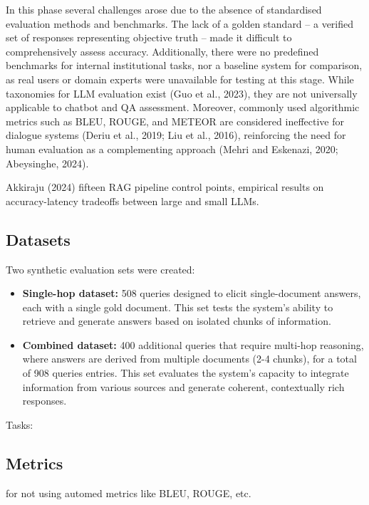 \begin{spacing}{1.5}
In this phase several challenges arose due to the absence of standardised
evaluation methods and benchmarks. The lack of a golden standard – a verified set of responses representing objective truth – made it difficult to comprehensively assess accuracy. Additionally, there were no predefined benchmarks for internal institutional tasks, nor a baseline system for comparison, as real users or domain experts were unavailable for testing at this stage. While taxonomies for LLM evaluation exist (Guo et al., 2023), they are not universally applicable to chatbot and QA assessment. Moreover,
commonly used algorithmic metrics such as BLEU, ROUGE, and METEOR are
considered ineffective for dialogue systems (Deriu et al., 2019; Liu et al., 2016), reinforcing the need for human evaluation as a complementing approach (Mehri and
Eskenazi, 2020; Abeysinghe, 2024).

Akkiraju (2024) fifteen RAG pipeline control points, empirical results on accuracy-latency tradeoffs between large and small LLMs.

\subsection{Datasets}\label{sec:datasets}

Two synthetic evaluation sets were created:
\begin{itemize}
      \item \textbf{Single-hop dataset:} 508 queries designed to elicit single-document answers, each with a single gold document. This set tests the system's ability to retrieve and generate answers based on isolated chunks of information.
      \item \textbf{Combined dataset:} 400 additional queries that require multi-hop reasoning, where answers are derived from multiple documents (2-4 chunks), for a total of 908 queries entries. This set evaluates the system's capacity to integrate information from various sources and generate coherent, contextually rich responses.
\end{itemize}

Tasks:


\subsection{Metrics}\label{sec:metrics}

\citep{liu_how_2016} for not using automed metrics like BLEU, ROUGE, etc.


\end{spacing}
